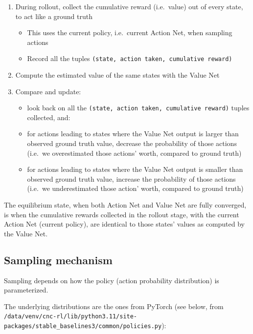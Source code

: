 \documentclass[
  letterpaper,
  DIV=11,
  numbers=noendperiod]{scrartcl}
\providecommand{\tightlist}{%
  \setlength{\itemsep}{0pt}\setlength{\parskip}{0pt}}\usepackage{longtable,booktabs,array}
\begin{document}
\begin{enumerate}
\def\labelenumi{\arabic{enumi}.}
\tightlist
\item
  During rollout, collect the cumulative reward (i.e.~value) out of
  every state, to act like a ground truth

  \begin{itemize}
  \tightlist
  \item
    This uses the current policy, i.e.~current Action Net, when sampling
    actions
  \item
    Record all the tuples
    \texttt{(state,\ action\ taken,\ cumulative\ reward)}
  \end{itemize}
\item
  Compute the estimated value of the same states with the Value Net
\item
  Compare and update:

  \begin{itemize}
  \tightlist
  \item
    look back on all the
    \texttt{(state,\ action\ taken,\ cumulative\ reward)} tuples
    collected, and:
  \item
    for actions leading to states where the Value Net output is larger
    than observed ground truth value, decrease the probability of those
    actions (i.e.~we overestimated those actions' worth, compared to
    ground truth)
  \item
    for actions leading to states where the Value Net output is smaller
    than observed ground truth value, increase the probability of those
    actions (i.e.~we underestimated those action' worth, compared to
    ground truth)
  \end{itemize}
\end{enumerate}

The equilibrium state, when both Action Net and Value Net are fully
converged, is when the cumulative rewards collected in the rollout
stage, with the current Action Net (current policy), are identical to
those states' values as computed by the Value Net.

\hypertarget{sampling-mechanism}{%
\subsection{Sampling mechanism}\label{sampling-mechanism}}

Sampling depends on how the policy (action probability distribution) is
parameterized.

The underlying distributions are the ones from PyTorch (see below, from
\texttt{/data/venv/cnc-rl/lib/python3.11/site-packages/stable\_baselines3/common/policies.py}):
\end{document}
